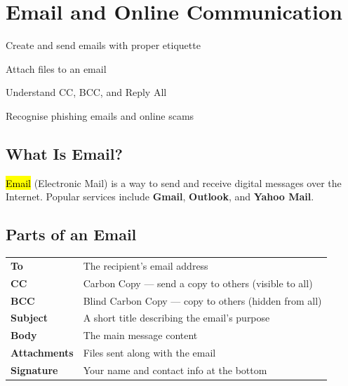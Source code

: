 \chapter{Email and Online Communication}
\label{ch:email}

\begin{objectives}
  \item Create and send emails with proper etiquette
  \item Attach files to an email
  \item Understand CC, BCC, and Reply All
  \item Recognise phishing emails and online scams
\end{objectives}


\section{What Is Email?}
\label{sec:what-email}

\hl{Email} (Electronic Mail) is a way to send and receive digital messages over the Internet. Popular services include \textbf{Gmail}, \textbf{Outlook}, and \textbf{Yahoo Mail}.

\section{Parts of an Email}
\label{sec:email-parts}

\begin{theorybox}
\begin{tabular}{ll}
  \textbf{To} & The recipient's email address \\
  \textbf{CC} & Carbon Copy --- send a copy to others (visible to all) \\
  \textbf{BCC} & Blind Carbon Copy --- copy to others (hidden from all) \\
  \textbf{Subject} & A short title describing the email's purpose \\
  \textbf{Body} & The main message content \\
  \textbf{Attachments} & Files sent along with the email \\
  \textbf{Signature} & Your name and contact info at the bottom \\
\end{tabular}
\end{theorybox}

